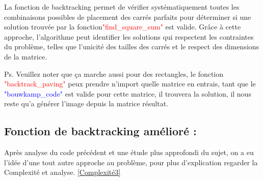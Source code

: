 \documentclass{article}
\begin{document}
La fonction de backtracking permet de vérifier systématiquement toutes les combinaisons possibles de placement des carrés parfaits pour déterminer si une solution trouvée par la fonction\textcolor{red}{"find\_square\_sum"}  est valide. Grâce à cette approche, l'algorithme peut identifier les solutions qui respectent les contraintes du problème, telles que l'unicité des tailles des carrés et le respect des dimensions de la matrice.\newline

Ps. Veuillez noter que ça marche aussi pour des rectangles, le fonction \textcolor{red}{"backtrack\_paving"} peux prendre n'import quelle matrice en entrais, tant que le \textcolor{blue}{"bouwkamp\_code"} est valide pour cette matrice, il trouvera la solution, il nous reste qu'a générer l'image depuis la matrice résultat.


\subsection{Fonction de backtracking amélioré :}

Après analyse du code précédent et une étude plus approfondi du sujet, on a eu l'idée d'une tout autre approche au problème, pour plus d'explication regarder la Complexité et analyse.  \ref{Complexité3}
\end{document}
